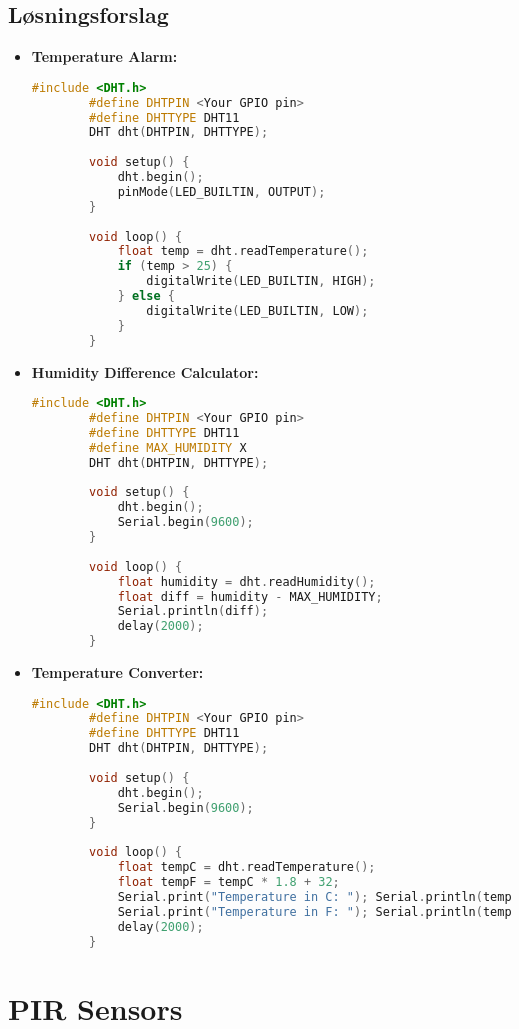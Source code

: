 \subsection*{Løsningsforslag}
\begin{itemize}
	\item \textbf{Temperature Alarm:} 
	\begin{lstlisting}[language=C++]
		#include <DHT.h>
		#define DHTPIN <Your GPIO pin>
		#define DHTTYPE DHT11
		DHT dht(DHTPIN, DHTTYPE);
		
		void setup() {
			dht.begin();
			pinMode(LED_BUILTIN, OUTPUT);
		}
		
		void loop() {
			float temp = dht.readTemperature();
			if (temp > 25) {
				digitalWrite(LED_BUILTIN, HIGH);
			} else {
				digitalWrite(LED_BUILTIN, LOW);
			}
		}
	\end{lstlisting}
	
	\item \textbf{Humidity Difference Calculator:}
	\begin{lstlisting}[language=C++]
		#include <DHT.h>
		#define DHTPIN <Your GPIO pin>
		#define DHTTYPE DHT11
		#define MAX_HUMIDITY X
		DHT dht(DHTPIN, DHTTYPE);
		
		void setup() {
			dht.begin();
			Serial.begin(9600);
		}
		
		void loop() {
			float humidity = dht.readHumidity();
			float diff = humidity - MAX_HUMIDITY;
			Serial.println(diff);
			delay(2000);
		}
	\end{lstlisting}
	
	\item \textbf{Temperature Converter:} 
	\begin{lstlisting}[language=C++]
		#include <DHT.h>
		#define DHTPIN <Your GPIO pin>
		#define DHTTYPE DHT11
		DHT dht(DHTPIN, DHTTYPE);
		
		void setup() {
			dht.begin();
			Serial.begin(9600);
		}
		
		void loop() {
			float tempC = dht.readTemperature();
			float tempF = tempC * 1.8 + 32;
			Serial.print("Temperature in C: "); Serial.println(tempC);
			Serial.print("Temperature in F: "); Serial.println(tempF);
			delay(2000);
		}
	\end{lstlisting}
\end{itemize}

\section{PIR Sensors}

